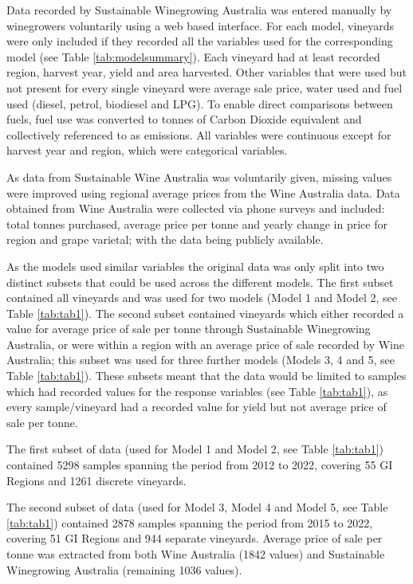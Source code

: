 \documentclass[review,12pt,authoryear]{elsarticle}
\begin{document}
\begin{linenumbers}
Data recorded by Sustainable Winegrowing Australia was entered manually by winegrowers voluntarily using a web based interface. For each model, vineyards were only included if they recorded all the variables used for the corresponding model (see Table \ref{tab:modelsummary}). Each vineyard had at least recorded region, harvest year, yield and area harvested. Other variables that were used but not present for every single vineyard were average sale price, water used and fuel used (diesel, petrol, biodiesel and LPG). To enable direct comparisons between fuels, fuel use was converted to tonnes of Carbon Dioxide equivalent and collectively referenced to as emissions. All variables were continuous except for harvest year and region, which were categorical variables.
\par
As data from Sustainable Wine Australia was voluntarily given, missing values were improved using regional average prices from the Wine Australia data. Data obtained from Wine Australia were collected via phone surveys and included: total tonnes purchased, average price per tonne and yearly change in price for region and grape varietal; with the data being publicly available.
\par
As the models used similar variables the original data was only split into two distinct subsets that could be used across the different models. The first subset contained all vineyards and was used for two models (Model 1 and Model 2, see Table \ref{tab:tab1}). The second subset contained vineyards which either recorded a value for average price of sale per tonne through Sustainable Winegrowing Australia, or were within a region with an average price of sale recorded by Wine Australia; this subset was used for three further models (Models 3, 4 and 5, see Table \ref{tab:tab1}). These subsets meant that the data would be limited to samples which had recorded values for the response variables (see Table \ref{tab:tab1}), as every sample/vineyard had a recorded value for yield but not average price of sale per tonne.
\par
The first subset of data (used for Model 1 and Model 2, see Table \ref{tab:tab1}) contained 5298 samples spanning the period from 2012 to 2022, covering 55 GI Regions and 1261 discrete vineyards.
\par
The second subset of data (used for Model 3, Model 4 and Model 5, see Table \ref{tab:tab1}) contained 2878 samples spanning the period from 2015 to 2022, covering 51 GI Regions and 944 separate vineyards. Average price of sale per tonne was extracted from both Wine Australia (1842 values) and Sustainable Winegrowing Australia (remaining 1036 values).

\end{linenumbers}
\end{document}
